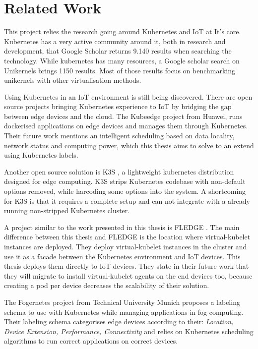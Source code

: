 
\chapter{Related Work}\label{chapter:literature}

This project relies the research going around Kubernetes and IoT at It's core. Kubernetes has a very active community around it, both in research and development, that Google Scholar returns 9.140 results when searching the technology. While kubernetes has many resources, a Google scholar search on Unikernels brings 1150 results. Most of those results focus on benchmarking unikernels with other virtualisation methods.

Using Kubernetes in an IoT environment is still being discovered. There are open source projects bringing Kubernetes experience to IoT by bridging the gap between edge devices and the cloud. The Kubeedge project \cite{kubeedge} from Huawei, runs dockerised applications on edge devices and manages them through Kubernetes. Their future work mentions an intelligent scheduling based on data locality, network status and computing power, which this thesis aims to solve to an extend using Kubernetes labels.

Another open source solution is K3S \cite{k3s}, a lightweight kubernetes distribution designed for edge computing. K3S strips Kubernetes codebase with non-default options removed, while harcoding some options into the system. A shortcoming for K3S is that it requires a complete setup and can not integrate with a already running non-stripped Kubernetes cluster.

A project similar to the work presented in this thesis is FLEDGE \cite{fledge}. The main difference between this thesis and FLEDGE is the location where virtual-kubelet instances are deployed. They deploy virtual-kubelet instances in the cluster and use it as a facade between the Kubernetes environment and IoT devices. This thesis deploys them directly to IoT devices. They state in their future work that they will migrate to install virtual-kubelet agents on the end devices too, because creating a pod per device decreases the scalability of their solution.

The Fogernetes project\cite{fogernetes} from Technical University Munich proposes a labeling schema to use with Kubernetes while managing applications in fog computing. Their labeling schema categorises edge devices according to their: \textit{Location, Device Extension, Performance, Connectivity} and relies on Kubernetes scheduling algorithms to run correct applications on correct devices.


